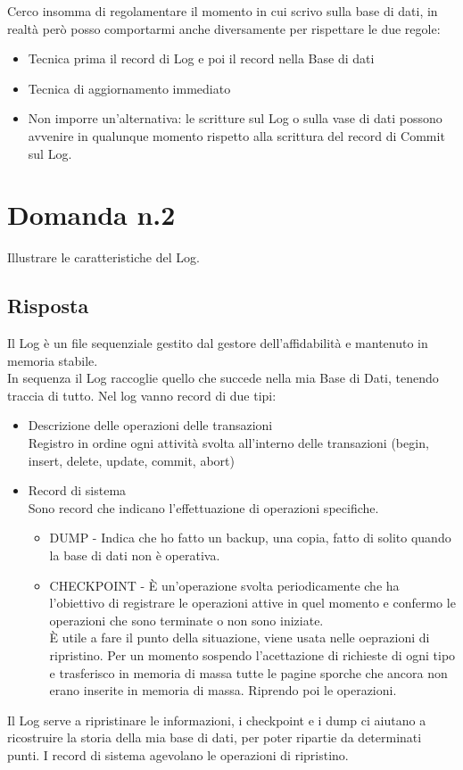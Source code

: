 \documentclass{article}
\begin{document}
Cerco insomma di regolamentare il momento in cui scrivo sulla base di dati, in realtà però posso comportarmi anche diversamente per rispettare le due regole:
\begin{itemize}
    \item Tecnica prima il record di Log e poi il record nella Base di dati
    \item Tecnica di aggiornamento immediato 
    \item Non imporre un'alternativa: le scritture sul Log o sulla vase di dati possono avvenire in qualunque momento rispetto alla scrittura del record di Commit sul Log.
\end{itemize}

\section*{Domanda n.2}
Illustrare le caratteristiche del Log.
\subsection*{Risposta}
Il Log è un file sequenziale gestito dal gestore dell'affidabilità e mantenuto in memoria stabile.\\
In sequenza il Log raccoglie quello che succede nella mia Base di Dati, tenendo traccia di tutto. Nel log vanno record di due tipi:
\begin{itemize}
    \item Descrizione delle operazioni delle transazioni\\Registro in ordine ogni attività svolta all'interno delle transazioni (begin, insert, delete, update, commit, abort)
    \item Record di sistema\\Sono record che indicano l'effettuazione di operazioni specifiche. 
        \begin{itemize}
            \item DUMP - Indica che ho fatto un backup, una copia, fatto di solito quando la base di dati non è operativa.
            \item CHECKPOINT - È un'operazione svolta periodicamente che ha l'obiettivo di registrare le operazioni attive in quel momento e confermo le operazioni che sono terminate o non sono iniziate.\\
                È utile a fare il punto della situazione, viene usata nelle oeprazioni di ripristino. Per un momento sospendo l'acettazione di richieste di ogni tipo e trasferisco in memoria di massa tutte le pagine sporche che ancora non erano inserite in memoria di massa. Riprendo poi le operazioni.
        \end{itemize}
\end{itemize}
Il Log serve a ripristinare le informazioni, i checkpoint e i dump ci aiutano a ricostruire la storia della mia base di dati, per poter ripartie da determinati punti. I record di sistema agevolano le operazioni di ripristino.
\end{document}
